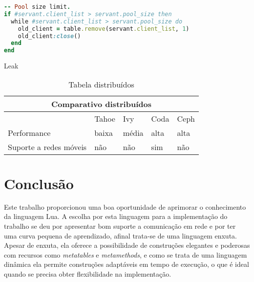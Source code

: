 \documentclass[11pt]{article}
\begin{document}
\begin{lstlisting}[label={connpool},language=Ruby,caption=Connection Pool]
-- Pool size limit.
if #servant.client_list > servant.pool_size then
  while #servant.client_list > servant.pool_size do
    old_client = table.remove(servant.client_list, 1)
    old_client:close()
  end
end
\end{lstlisting}

Leak \cite{weakt}

\renewcommand{\arraystretch}{2}
\begin{table}
\begin{center}
{\footnotesize \begin{tabular}{p{2.5cm} p{2.5cm} p{2.5cm} p{2.5cm} p{2.5cm}}
\hline
\multicolumn{5}{c}{Comparativo distribuídos} \\ \hline
~ & Tahoe & Ivy & Coda & Ceph \\ \hline
Performance & baixa & média & alta & alta \\
Suporte a redes móveis & não & não & sim & não \\
\hline
\end{tabular}}
\caption{Tabela distribuídos}
\label{tab:compare}
\end{center}
\end{table}

\section{Conclusão}\label{sec:conclusion}

Este trabalho proporcionou uma boa oportunidade de aprimorar o conhecimento da
linguagem Lua. A escolha por esta linguagem para a implementação do trabalho se
deu por apresentar bom suporte a comunicação em rede e por ter uma curva pequena
de aprendizado, afinal trata-se de uma linguagem enxuta. Apesar de enxuta, ela
oferece a possibilidade de construções elegantes e poderosas com recursos como
\textit{metatables} e \textit{metamethods}, e como se trata de uma linguagem
dinâmica ela permite construções adaptáveis em tempo de execução, o que é ideal
quando se precisa obter flexibilidade na implementação.



\end{document}
